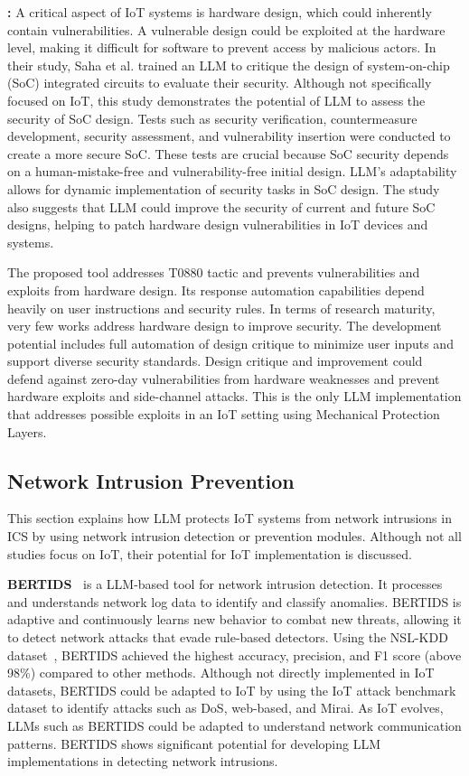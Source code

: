 \smallskip
\noindent \textbf{\citet{saha2023llm} : } A critical aspect of IoT systems is hardware design, which could inherently contain vulnerabilities.
A vulnerable design could be exploited at the hardware level, making it difficult for software to prevent access by malicious actors.
In their study, Saha et al. trained an LLM to critique the design of system-on-chip (SoC) integrated circuits to evaluate their security.
Although not specifically focused on IoT, this study demonstrates the potential of LLM to assess the security of SoC design.
Tests such as security verification, countermeasure development, security assessment, and vulnerability insertion were conducted to create a more secure SoC.
These tests are crucial because SoC security depends on a human-mistake-free and vulnerability-free initial design.
LLM's adaptability allows for dynamic implementation of security tasks in SoC design.
The study also suggests that LLM could improve the security of current and future SoC designs, helping to patch hardware design vulnerabilities in IoT devices and systems.

The proposed tool addresses T0880 tactic and prevents vulnerabilities and exploits from hardware design.
Its response automation capabilities depend heavily on user instructions and security rules.
In terms of research maturity, very few works address hardware design to improve security.
The development potential includes full automation of design critique to minimize user inputs and support diverse security standards.
Design critique and improvement could defend against zero-day vulnerabilities from hardware weaknesses and prevent hardware exploits and side-channel attacks.
This is the only LLM implementation that addresses possible exploits in an IoT setting using Mechanical Protection Layers.
%
\subsection{Network Intrusion Prevention}
%
This section explains how LLM protects IoT systems from network intrusions in ICS by using network intrusion detection or prevention modules.
Although not all studies focus on IoT, their potential for IoT implementation is discussed.

\smallskip
\noindent \textbf{BERTIDS~\citet{lira2024}} is a LLM-based tool for network intrusion detection.
It processes and understands network log data to identify and classify anomalies.
BERTIDS is adaptive and continuously learns new behavior to combat new threats, allowing it to detect network attacks that evade rule-based detectors.
Using the NSL-KDD dataset~\citet{nslkdd2009}, BERTIDS achieved the highest accuracy, precision, and F1 score (above 98\%) compared to other methods.
Although not directly implemented in IoT datasets, BERTIDS could be adapted to IoT by using the IoT attack benchmark dataset to identify attacks such as DoS, web-based, and Mirai.
As IoT evolves, LLMs such as BERTIDS could be adapted to understand network communication patterns.
BERTIDS shows significant potential for developing LLM implementations in detecting network intrusions.

